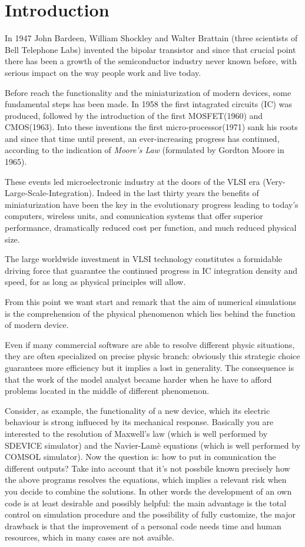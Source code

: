 \chapter{Introduction}

In 1947 John Bardeen, William Shockley and Walter Brattain (three scientists of Bell Telephone Labs) invented the bipolar transistor and since that crucial point there has been a growth  of the semiconductor industry never known before, with serious impact on the way people work and live today. 

Before reach the functionality and the miniaturization of modern devices, some fundamental steps has been made.
In 1958 the first intagrated circuits (IC) was produced, followed by the introduction of the first MOSFET(1960) and CMOS(1963). Into these inventions the first micro-processor(1971) sank his roots  and since that time until present, an ever-increasing progress has continued, according to the indication of \textit{Moore's Law} (formulated by Gordton Moore in 1965).

These events led microelectronic industry at the doors of the VLSI era (Very-Large-Scale-Integration). Indeed in the last thirty years the benefits of miniaturization have been the key in the evolutionary progress leading to today's computers, wireless units, and comunication systems that offer superior performance, dramatically reduced cost per function, and much reduced physical size.

The large worldwide investment in VLSI technology constitutes a formidable driving force that guarantee the continued progress in IC integration density and speed, for as long as physical principles will allow.

From this point we want start and remark that the aim of numerical simulations is the comprehension of the physical phenomenon which lies behind the function of modern device. 

Even if many commercial software are able to resolve different physic situations, they are often specialized on precise physic branch: obviously this strategic choice guarantees more efficiency but it implies a lost in generality. The consequence is that the work of the model analyst became harder when he have to afford problems located in the middle of different phenomenon. 

Consider, as example, the functionality of a new device, which its electric behaviour is strong influeced by its mechanical response. Basically you are interested to the resolution of Maxwell's law  (which is well performed by SDEVICE simulator) and the Navier-Lam\`e equations (which is well performed by COMSOL simulator). Now the question is: how to put in comunication the different outputs?
Take into account that it's not possbile known precisely how the above programs resolves the equations, which implies a relevant risk when you decide to combine the solutions. 
In other words the development of an own code is at least desirable and possibly helpful: the main advantage is the total control on simulation procedure and the possibility of fully customize, the major drawback is that the improvement of a personal code needs time and human resources, which in many cases are not avaible.   


